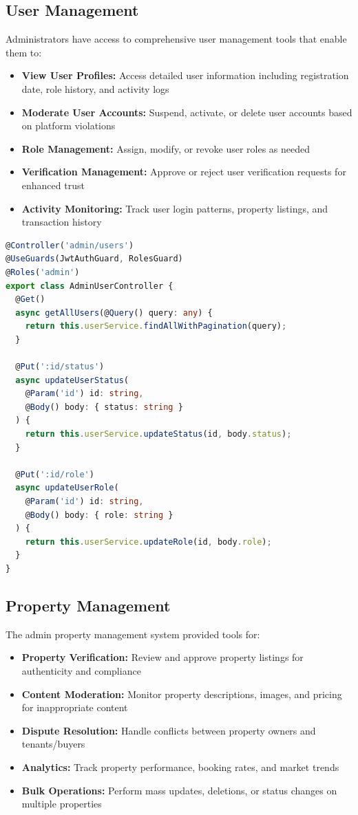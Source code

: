 \documentclass[conference]{IEEEtran}
\begin{document}
\subsection{User Management}
Administrators have access to comprehensive user management tools that enable them to:

\begin{itemize}
    \item \textbf{View User Profiles:} Access detailed user information including registration date, role history, and activity logs
    \item \textbf{Moderate User Accounts:} Suspend, activate, or delete user accounts based on platform violations
    \item \textbf{Role Management:} Assign, modify, or revoke user roles as needed
    \item \textbf{Verification Management:} Approve or reject user verification requests for enhanced trust
    \item \textbf{Activity Monitoring:} Track user login patterns, property listings, and transaction history
\end{itemize}

\begin{lstlisting}[language=TypeScript, caption=Admin User Management Controller]
@Controller('admin/users')
@UseGuards(JwtAuthGuard, RolesGuard)
@Roles('admin')
export class AdminUserController {
  @Get()
  async getAllUsers(@Query() query: any) {
    return this.userService.findAllWithPagination(query);
  }
  
  @Put(':id/status')
  async updateUserStatus(
    @Param('id') id: string,
    @Body() body: { status: string }
  ) {
    return this.userService.updateStatus(id, body.status);
  }
  
  @Put(':id/role')
  async updateUserRole(
    @Param('id') id: string,
    @Body() body: { role: string }
  ) {
    return this.userService.updateRole(id, body.role);
  }
}
\end{lstlisting}

\subsection{Property Management}
The admin property management system provided tools for:

\begin{itemize}
    \item \textbf{Property Verification:} Review and approve property listings for authenticity and compliance
    \item \textbf{Content Moderation:} Monitor property descriptions, images, and pricing for inappropriate content
    \item \textbf{Dispute Resolution:} Handle conflicts between property owners and tenants/buyers
    \item \textbf{Analytics:} Track property performance, booking rates, and market trends
    \item \textbf{Bulk Operations:} Perform mass updates, deletions, or status changes on multiple properties
\end{itemize}
\end{document}
